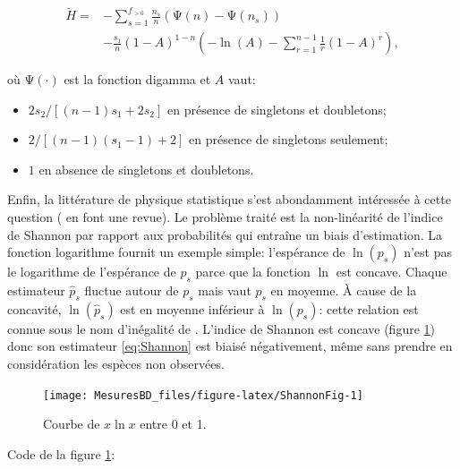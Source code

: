 \documentclass[
  11pt,
  american,
  a4paper,
  extrafontsizes,onecolumn,openright
  ]{memoir}
\providecommand{\tightlist}{%
  \setlength{\itemsep}{0pt}\setlength{\parskip}{0pt}}
\begin{document}
\begin{align}
  \label{eq:Chao2013}
  \tilde{H}
  = &-\sum_{s=1}^{f_{>0}}
    {\frac{n_s}{n} \left( \mathrm{\Psi}\left( n \right) - \mathrm{\Psi}\left( n_s \right) \right)} \\
    &-\frac{s_{1}}{n} {\left(1 - A \right)}^{1 - n} \left( 
      -\ln\left( A \right) -\sum^{n-1}_{r=1}{\frac{1}{r}{\left( 1 - A \right)}^r} \right
    ),
\end{align}

où \(\mathrm{\Psi}(\cdot)\) est la fonction digamma et \(A\) vaut:

\begin{itemize}
\tightlist
\item
  \(2s_{2} / [(n - 1) s_{1} + 2 s_{2}]\) en présence de singletons et doubletons;
\item
  \(2 / [(n - 1) (s_1 -1) + 2]\) en présence de singletons seulement;
\item
  \(1\) en absence de singletons et doubletons.
\end{itemize}

Enfin, la littérature de physique statistique s'est abondamment intéressée à cette question (\textcite{Bonachela2008} en font une revue).
Le problème traité est la non-linéarité de l'indice de Shannon par rapport aux probabilités qui entraîne un biais d'estimation.
La fonction logarithme fournit un exemple simple: l'espérance de \(\ln(p_s)\) n'est pas le logarithme de l'espérance de \(p_s\) parce que la fonction \(\ln\) est concave.
Chaque estimateur \({\hat{p}}_s\) fluctue autour de \(p_s\) mais vaut \(p_s\) en moyenne.
À cause de la concavité, \(\ln(\hat{p}_s)\) est en moyenne inférieur à \(\ln(p_s)\): cette relation est connue sous le nom d'inégalité de \textcite{Jensen1906}.
L'indice de Shannon est concave (figure \ref{fig:ShannonFig}) donc son estimateur \eqref{eq:Shannon} est biaisé négativement, même sans prendre en considération les espèces non observées.



\scriptsize

\begin{figure}

{\centering \texttt{[image: MesuresBD\_files/figure-latex/ShannonFig-1]} 

}

\caption{Courbe de \(x\ln x\) entre 0 et 1.}\label{fig:ShannonFig}
\end{figure}

\normalsize

Code de la figure \ref{fig:ShannonFig}:
\end{document}
